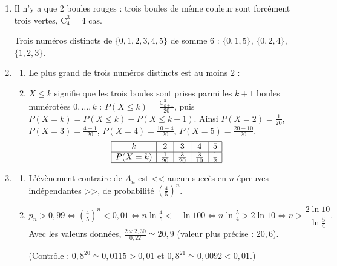 \begin{enumerate}
   \item {}
      Il n'y a que 2 boules rouges : trois boules de m\^eme couleur sont forc\'ement trois vertes, $\mathrm{C}_4^3 = 4$ cas.
      \par\noindent{}

      Trois num\'eros distincts de $\{0, 1, 2, 3, 4, 5\}$ de somme $6$ : $\{0, 1, 5\}$, $\{0, 2, 4\}$, $\{1, 2, 3\}$.
      \par\noindent{}
   \item
      \begin{enumerate}
         \item {}
            Le plus grand de trois num\'eros distincts est au moins $2$ : 
         \item {}
            $X \leq k$ signifie que les trois boules sont prises parmi les $k + 1$ boules num\'erot\'ees $0, \dots, k$ :
            $P(X \leq k) = \frac{\mathrm{C}_{k+1}^3}{20}$, puis $P(X = k) = P(X \leq k) - P(X \leq k - 1)$.
            Ainsi $P(X = 2) = \frac{1}{20}$, $P(X = 3) = \frac{4 - 1}{20}$, $P(X = 4) = \frac{10 - 4}{20}$, $P(X = 5) = \frac{20 - 10}{20}$.
            \[
               \begin{array}{|c|c|c|c|c|}
                  \hline
                  k & 2 & 3 & 4 & 5 \\ \hline
                  P(X = k) & \frac{1}{20} & \frac{3}{20} & \frac{3}{10} & \frac{1}{2} \\ \hline
               \end{array}
            \]
      \end{enumerate}
   \item
      \begin{enumerate}
         \item {}
            L'\'ev\`enement contraire de $A_n$ est << aucun succ\`es en $n$ \'epreuves ind\'ependantes >>, de probabilit\'e $\left(\frac{4}{5}\right)^n$.
            \par\noindent{}
         \item {}
            \[
               p_n > 0{,}99 \iff \left(\tfrac{4}{5}\right)^n < 0{,}01 \iff n\ln\tfrac{4}{5} < -\ln 100
               \iff n\ln\tfrac{5}{4} > 2\ln 10 \iff n > \frac{2\ln 10}{\ln\frac{5}{4}}.
            \]
            Avec les valeurs donn\'ees, $\frac{2 \times 2{,}30}{0{,}22} \simeq 20{,}9$ (valeur plus pr\'ecise : $20{,}6$).
            \par\noindent{}
            (Contr\^ole : $0{,}8^{20} \simeq 0{,}0115 > 0{,}01$ et $0{,}8^{21} \simeq 0{,}0092 < 0{,}01$.)
      \end{enumerate}
\end{enumerate}
